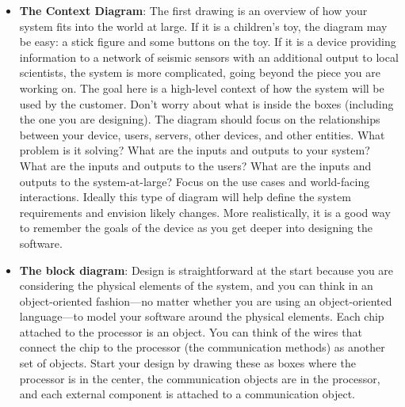 \documentclass{report}
\begin{document}
\begin{itemize}
            \bigbreak \noindent 
            I recommend four types of diagrams:
            \begin{enumerate}
                \item Context diagram
                \item Block diagram
                \item Organigram
                \item Layering diagram
            \end{enumerate}
        \item \textbf{The Context Diagram}: The first drawing is an overview of how your system fits into the world at large. If it is a children’s toy, the diagram may be easy: a stick figure and some buttons on the toy. If it is a device providing information to a network of seismic sensors with an additional output to local scientists, the system is more complicated, going beyond the piece you are working on.
            \bigbreak \noindent 
            The goal here is a high-level context of how the system will be used by the customer. Don’t worry about what is inside the boxes (including the one you are designing). The diagram should focus on the relationships between your device, users, servers, other devices, and other entities.
            \bigbreak \noindent 
            What problem is it solving? What are the inputs and outputs to your system? What are the inputs and outputs to the users? What are the inputs and outputs to the system-at-large? Focus on the use cases and world-facing interactions.
            \bigbreak \noindent 
            Ideally this type of diagram will help define the system requirements and envision likely changes. More realistically, it is a good way to remember the goals of the device as you get deeper into designing the software.
            \bigbreak \noindent 
        \item \textbf{The block diagram}: Design is straightforward at the start because you are considering the physical elements of the system, and you can think in an object-oriented fashion—no matter whether you are using an object-oriented language—to model your software around the physical elements. Each chip attached to the processor is an object. You can think of the wires that connect the chip to the processor (the communication methods) as another set of objects.
            \bigbreak \noindent 
            Start your design by drawing these as boxes where the processor is in the center, the communication objects are in the processor, and each external component is attached to a communication object.

\end{itemize}
\end{document}
